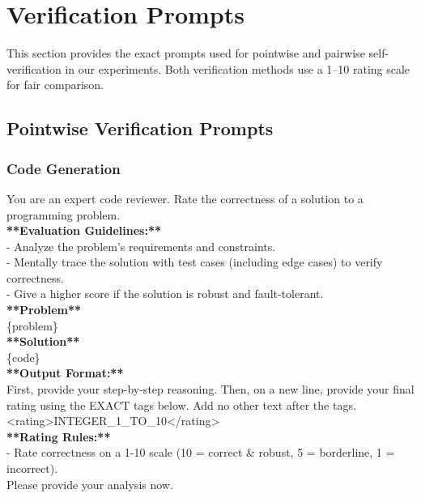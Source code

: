\clearpage
\section{Verification Prompts}
\label{sec:appendix_prompts}

This section provides the exact prompts used for pointwise and pairwise self-verification in our experiments. Both verification methods use a 1--10 rating scale for fair comparison.

\subsection{Pointwise Verification Prompts}

\subsubsection{Code Generation}

\begin{tcolorbox}[
    colback=promptbg,
    colframe=promptborder,
    title={\textbf{Pointwise Code Verification Prompt}},
    coltitle=white,
    fonttitle=\small\bfseries,
    breakable,
    enhanced
]
\small
\ttfamily
You are an expert code reviewer. Rate the correctness of a solution to a programming problem.\\[0.5em]
\textbf{**Evaluation Guidelines:**}\\
- Analyze the problem's requirements and constraints.\\
- Mentally trace the solution with test cases (including edge cases) to verify correctness.\\
- Give a higher score if the solution is robust and fault-tolerant.\\[0.5em]
\textbf{**Problem**}\\
\{problem\}\\[0.5em]
\textbf{**Solution**}\\
\{code\}\\[0.5em]
\textbf{**Output Format:**}\\
First, provide your step-by-step reasoning. Then, on a new line, provide your final rating using the EXACT tags below. Add no other text after the tags.\\
<rating>INTEGER\_1\_TO\_10</rating>\\[0.5em]
\textbf{**Rating Rules:**}\\
- Rate correctness on a 1-10 scale (10 = correct \& robust, 5 = borderline, 1 = incorrect).\\
Please provide your analysis now.
\end{tcolorbox}

